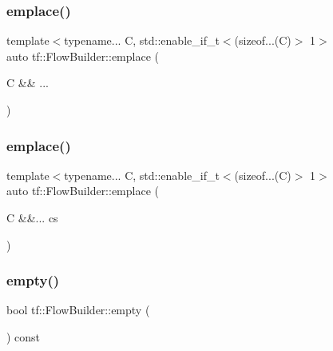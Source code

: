 \mbox{\label{classtf_1_1FlowBuilder_ac4ccd002efe1e62a328632ce704bcd7a}} 
\subsubsection{\texorpdfstring{emplace()}{emplace()}\hspace{0.1cm}{\footnotesize\ttfamily [2/3]}}
{\footnotesize\ttfamily template$<$typename... C, std\+::enable\+\_\+if\+\_\+t$<$(sizeof...(\+C)$>$ 1$>$ \\
auto tf\+::\+Flow\+Builder\+::emplace (\begin{DoxyParamCaption}\item[{C \&\&}]{... }\end{DoxyParamCaption})}

\mbox{\label{classtf_1_1FlowBuilder_aaf1c2bad2e5f31225584db88019a952a}} 
\subsubsection{\texorpdfstring{emplace()}{emplace()}\hspace{0.1cm}{\footnotesize\ttfamily [3/3]}}
{\footnotesize\ttfamily template$<$typename... C, std\+::enable\+\_\+if\+\_\+t$<$(sizeof...(\+C)$>$ 1$>$ \\
auto tf\+::\+Flow\+Builder\+::emplace (\begin{DoxyParamCaption}\item[{C \&\&...}]{cs }\end{DoxyParamCaption})}

\mbox{\label{classtf_1_1FlowBuilder_a18909c48304f1827884708dc943efb6a}} 
\subsubsection{\texorpdfstring{empty()}{empty()}}
{\footnotesize\ttfamily bool tf\+::\+Flow\+Builder\+::empty (\begin{DoxyParamCaption}{ }\end{DoxyParamCaption}) const\hspace{0.3cm}{\ttfamily [inline]}}

